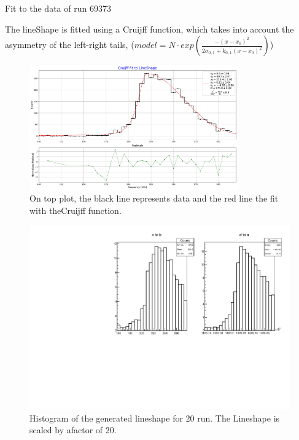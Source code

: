 \documentclass[9pt]{beamer}
\begin{document}
\begin{frame}{Fit to the data of run 69373}

The lineShape is fitted using a Cruijff function, which takes into account the asymmetry of the left-right tails, ($model = N \cdot exp(  \frac{-(x - x_{0})^2}{2\sigma_{0,1} + k_{0,1}(x - x_{0})^{2}})$) 

\begin{figure}[hbtp]
\centering
\includegraphics[width = 0.8\textwidth ]{../Plot/FitToLineShape.pdf}
\caption{On top plot, the black line represents data and the red line the fit with the\newline Cruijff function.}
\end{figure}
\end{frame}

\begin{frame}
\begin{figure}[hbtp]
\centering
\includegraphics[width = \textwidth]{../Plot/LineshapeSampled.pdf}
\caption{ Histogram of the generated lineshape for 20 run. The Lineshape is scaled by a\newline factor of 20.}
\end{figure}
\end{frame}
\end{document}
